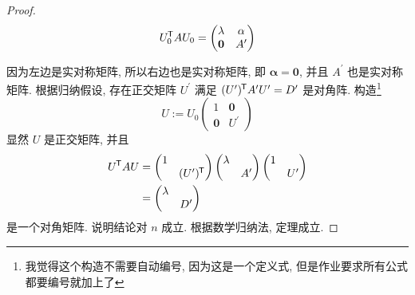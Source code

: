 \documentclass{ctexart}
\newcommand*{\tran}{^{\mkern-1.5mu\mathsf{T}}}
\begin{document}
\begin{proof}
\begin{equation}
\label{eq::equiv_3}
	U_0\tran AU_0 = \left(\begin{matrix}
	\lambda & \mathbf{\alpha} \\
	\mathbf{0} & A^\prime
	\end{matrix}\right)
\end{equation} \par
因为左边是实对称矩阵, 所以右边也是实对称矩阵, 即 $\mathbf{\alpha} = \mathbf{0}$, 并且 $A^\prime$ 也是实对称矩阵. 根据归纳假设, 存在正交矩阵 $U^\prime$ 满足 $(U^\prime)\tran A^\prime U^\prime = D^\prime$ 是对角阵. 构造\footnote{我觉得这个构造不需要自动编号, 因为这是一个定义式, 但是作业要求所有公式都要编号就加上了}
\begin{equation}
\label{eq::def_U}
	U := U_0\left(\begin{matrix}
	1 & \mathbf{0} \\
	\mathbf{0} & U^\prime
	\end{matrix}\right)
\end{equation}
显然 $U$ 是正交矩阵, 并且
\begin{equation}
\label{eq::result}
\begin{aligned}
	U\tran AU &= 
	\left(
	\begin{matrix}
	1 & \\
	  & (U^\prime)\tran
	\end{matrix}
	\right)
	\left(
	\begin{matrix}
	\lambda & \\
	  & A^\prime
	\end{matrix}
	\right)
	\left(
	\begin{matrix}
	1 & \\
	 & U^\prime
	\end{matrix}
	\right) \\
	&=
	\left(\begin{matrix}
	\lambda &  \\
	 & D^\prime
	\end{matrix}\right)
\end{aligned}
\end{equation}
是一个对角矩阵. 说明结论对 $n$ 成立. 根据数学归纳法, 定理成立.
\end{proof}
\end{document}
